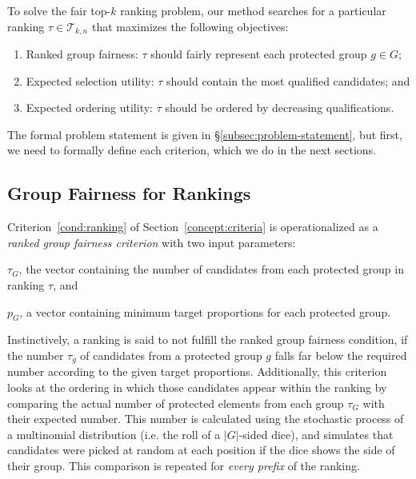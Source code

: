 \label{concept:criteria}
To solve the fair top-$k$ ranking problem, our method searches for a particular ranking $\tau \in {\mathcal T}_{k,n}$ that maximizes the following objectives: %

\begin{enumerate}[{Criterion} 1.]
	\item Ranked group fairness: $\tau$ should fairly represent each protected group $g \in G$; \label{cond:ranking}

	\item Expected selection utility: $\tau$ should contain the most qualified candidates; and \label{cond:selection}

	\item Expected ordering utility: $\tau$ should be ordered by decreasing qualifications.\label{cond:ordering}
\end{enumerate}
%
The formal problem statement is given in \S\ref{subsec:problem-statement}, but first, we need to formally define each criterion, which we do in the next sections.

\subsection{Group Fairness for Rankings}
\label{subsec:group-fairness}

Criterion~\ref{cond:ranking} of Section~\ref{concept:criteria} is operationalized as a \emph{ranked group fairness criterion} with two input parameters:
\begin{inparaenum}[(i)]
	\item $ \tau_G $, the vector containing the number of candidates from each protected group in ranking $ \tau $, and
	\item $ p_G $, a vector containing minimum target proportions for each protected group.
\end{inparaenum}
%
Instinctively, a ranking is said to not fulfill the ranked group fairness condition, if the number $\tau_g$ of candidates from a protected group $g$ falls far below the required number according to the given target proportions.
%
Additionally, this criterion looks at the ordering in which those candidates appear within the ranking by comparing the actual number of protected elements from each group $\tau_G$ with their expected number.
%
This number is calculated using the stochastic process of a multinomial distribution (i.e. the roll of a $|G|$-sided dice), and simulates that candidates were picked at random at each position if the dice shows the side of their group. 
%
This comparison is repeated for \emph{every prefix} of the ranking.

